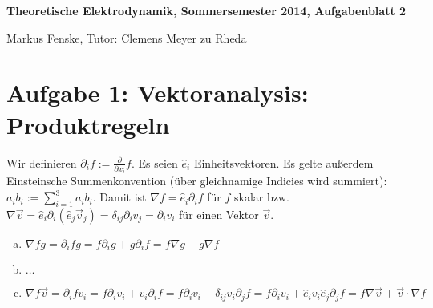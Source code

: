 \documentclass[a4paper,german,12pt,smallheadings]{scrartcl}
\begin{document}
\allowdisplaybreaks %
\begin{center}
\bfseries %
\sffamily %
\vspace{-40pt}
Theoretische Elektrodynamik, Sommersemester 2014, Aufgabenblatt 2

Markus Fenske, Tutor: Clemens Meyer zu Rheda
\vspace{-10pt}
\end{center}

\section*{Aufgabe 1: Vektoranalysis: Produktregeln}

Wir definieren $\partial_i f := \frac{\partial}{\partial x_i} f$.
Es seien $\hat{e}_i$ Einheitsvektoren.
Es gelte außerdem Einsteinsche Summenkonvention (über gleichnamige Indicies
wird summiert): $a_ib_i := \sum_{i=1}^3 a_ib_i$.
Damit ist $\nabla f = \hat{e}_i \partial_i f$ für $f$ skalar bzw. $\nabla
\vec{v} = \hat{e}_i \partial_i (\hat{e}_j \vec{v}_j) = \delta_{ij} \partial_i
v_j = \partial_i v_i$ für einen Vektor $\vec{v}$.

\begin{enumerate}[a)]
  \item $\nabla fg = \partial_i f g = f \partial_i g + g \partial_i f = f \nabla g + g \nabla f$
  \item $\dots$
  \item $\nabla f \vec{v}
    = \partial_i f v_i
    = f \partial_i v_i + v_i \partial_i f
    = f \partial_i v_i + \delta_{ij} v_i \partial_j f
    = f \partial_i v_i + \hat{e}_iv_i \hat{e}_j \partial_j f
    = f \nabla \vec{v} + \vec{v} \cdot \nabla f$
\end{enumerate}
\end{document}
